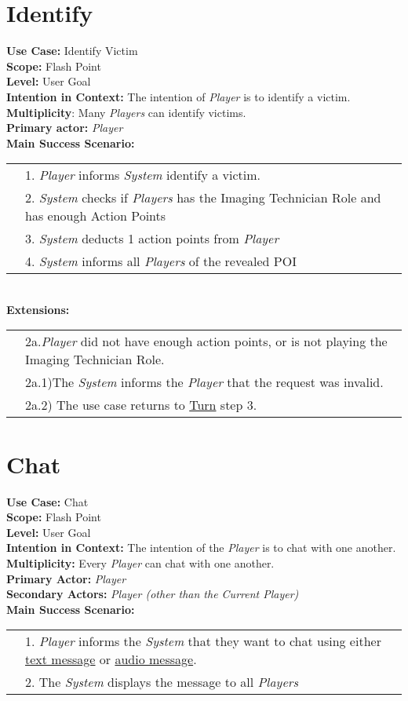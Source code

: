\documentclass{article}
\begin{document}
	\section*{Identify}
	\textbf{Use Case:} Identify Victim\\
	\textbf{Scope:} Flash Point\\
	\textbf{Level:} User Goal\\
	\textbf{Intention in Context:} The intention of \textit{Player} is to identify a victim.\\
	\textbf{Multiplicity}: Many \textit{Players} can identify victims.\\
	\textbf{Primary actor:} \textit{Player}\\
	\textbf{Main Success Scenario:}\\
	\begin{tabular}{l l}
		&1. \textit{Player} informs \textit{System} identify a victim.\\
		&2. \textit{System} checks if \textit{Players} has the Imaging Technician Role and has enough Action Points\\
		&3. \textit{System} deducts 1 action points from \textit{Player}\\
		&4. \textit{System} informs all \textit{Players} of the revealed POI\\
		
	\end{tabular}\\
	\textbf{Extensions:}\\
	\begin{tabular}{l l}
		&2a.\textit{Player} did not have enough action points, or is not playing the Imaging Technician Role.\\
		&\qquad2a.1)The \textit{System} informs the \textit{Player} that the request was invalid.\\
		&\qquad2a.2) The use case returns to \underline{Turn} step 3.
	\end{tabular}
	\section*{Chat}
	\textbf{Use Case:} Chat\\
	\textbf{Scope:} Flash Point\\
	\textbf{Level:} User Goal\\
	\textbf{Intention in Context: } The intention of the \textit{Player} is to chat with one another.\\
	\textbf{Multiplicity: } Every \textit{Player} can chat with one another.\\
	\textbf{Primary Actor:} \textit{Player}\\
	\textbf{Secondary Actors:} \textit{Player (other than the Current Player)}\\
	\textbf{Main Success Scenario:}\\
	\begin{tabular}{l l}
		&1. \textit{Player} informs the \textit{System} that they want to chat using either \underline{text message} or \underline{audio message}.\\
		&2. The \textit{System} displays the message to all \textit{Players}
	\end{tabular}
\end{document}
